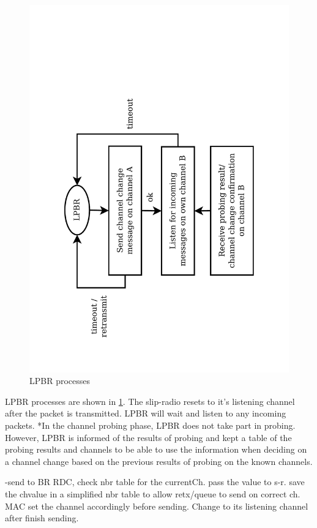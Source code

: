 \begin{figure}
\centering
\includegraphics[trim=2cm 1cm 2cm 4cm, clip=true, totalheight=0.55\textheight, angle=270]{lpbrProcess.pdf}
\caption{LPBR processes}
\label{lpbrProcess}
\end{figure}

LPBR processes are shown in \ref{lpbrProcess}.
The slip-radio resets to it's listening channel after the packet is transmitted. LPBR will wait and listen to any incoming packets. *In the channel probing phase, LPBR does not take part in probing. However, LPBR is informed of the results of probing and kept a table of the probing results and channels to be able to use the information when deciding on a channel change based on the previous results of probing on the known channels.

-send to BR RDC, check nbr table for the currentCh. pass the value to s-r. save the chvalue in a simplified nbr table to allow retx/queue to send on correct ch.
MAC set the channel accordingly before sending.
Change to its listening channel after finish sending. 


